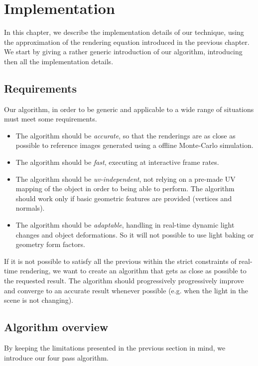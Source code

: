 \chapter{Implementation}

In this chapter, we describe the implementation details of our technique, using the approximation of the rendering equation introduced in the previous chapter. We start by giving a rather generic introduction of our algorithm, introducing then all the implementation details. 

\section{Requirements}

Our algorithm, in order to be generic and applicable to a wide range of situations must meet some requirements. 


\begin{itemize}
  \item The algorithm should be \emph{accurate}, so that the renderings are as close as possible to reference images generated using a offline Monte-Carlo simulation. 
	\item The algorithm should be \emph{fast}, executing at interactive frame rates.
	\item The algorithm should be \emph{uv-independent}, not relying on a pre-made UV mapping of the object in order to being able to perform. The algorithm should work only if basic geometric features are provided (vertices and normals).
	\item The algorithm should be \emph{adaptable}, handling in real-time dynamic light changes and object deformations. So it will not possible to use light baking or geometry form factors.
\end{itemize}

If it is not possible to satisfy all the previous within the strict constraints of real-time rendering, we want to create an algorithm that gets as close as possible to the requested result. The algorithm should progressively progressively improve and converge to an accurate result whenever possible (e.g. when the light in the scene is not changing).

\section{Algorithm overview}

By keeping the limitations presented in the previous section in mind, we introduce our four pass algorithm.

